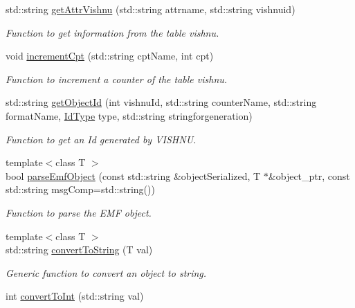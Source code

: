 \begin{DoxyCompactItemize}
std::string \hyperlink{namespacevishnu_a0adf01cdd878372e5fb44b3f1d9d86be}{getAttrVishnu} (std::string attrname, std::string vishnuid)
\begin{DoxyCompactList}\small\item\em Function to get information from the table vishnu. \item\end{DoxyCompactList}\item 
void \hyperlink{namespacevishnu_a999d6bcb9346a8b398d5c94eb01a125a}{incrementCpt} (std::string cptName, int cpt)
\begin{DoxyCompactList}\small\item\em Function to increment a counter of the table vishnu. \item\end{DoxyCompactList}\item 
std::string \hyperlink{namespacevishnu_a9349617bc14f92c6dfe67745dcbac8ff}{getObjectId} (int vishnuId, std::string counterName, std::string formatName, \hyperlink{namespacevishnu_aff8a694c2bc2b55465a31b4bf00f58c1}{IdType} type, std::string stringforgeneration)
\begin{DoxyCompactList}\small\item\em Function to get an Id generated by VISHNU. \item\end{DoxyCompactList}\item 
{\footnotesize template$<$class T $>$ }\\bool \hyperlink{namespacevishnu_a864d60dc9a2f4fe9048e522718698e84}{parseEmfObject} (const std::string \&objectSerialized, T $\ast$\&object\_\-ptr, const std::string msgComp=std::string())
\begin{DoxyCompactList}\small\item\em Function to parse the EMF object. \item\end{DoxyCompactList}\item 
{\footnotesize template$<$class T $>$ }\\std::string \hyperlink{namespacevishnu_add18720aacc1db6052abecedd5d6feaa}{convertToString} (T val)
\begin{DoxyCompactList}\small\item\em Generic function to convert an object to string. \item\end{DoxyCompactList}\item 
int \hyperlink{namespacevishnu_ac1899fb2792ddd63a003a06081fc9066}{convertToInt} (std::string val)

\end{DoxyCompactItemize}
